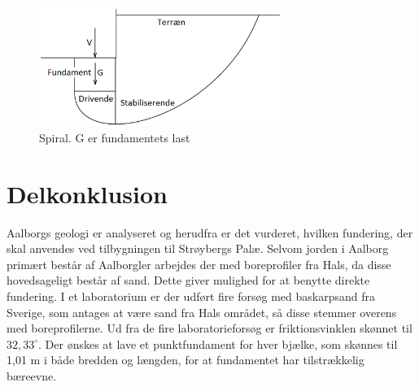 \begin{figure}[htbp]
	\centering
	\includegraphics[width=0.7\textwidth]{billeder/spiral.png}
	\caption{Spiral. G er fundamentets last}
	\label{fig:haha}
\end{figure}

\section{Delkonklusion}
Aalborgs geologi er analyseret og herudfra er det vurderet, hvilken fundering, der skal anvendes ved tilbygningen til Strøybergs Palæ. Selvom jorden i Aalborg primært består af Aalborgler arbejdes der med boreprofiler fra Hals, da disse hovedsageligt består af sand. Dette giver mulighed for at benytte direkte fundering. I et laboratorium er der udført fire forsøg med baskarpsand fra Sverige, som antages at være sand fra Hals området, så disse stemmer overens med boreprofilerne. Ud fra de fire laboratorieforsøg er friktionsvinklen skønnet til $32,\!33^{\circ}$. Der ønskes at lave et punktfundament for hver bjælke, som skønnes til 1,01 m i både bredden og længden, for at fundamentet har tilstrækkelig bæreevne.